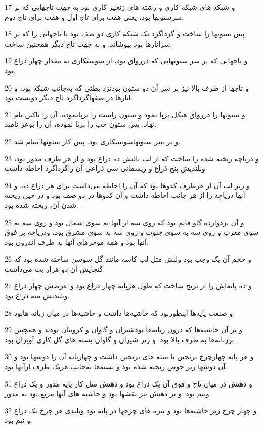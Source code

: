 \par 17 و شبکه های شبکه کاری و رشته های زنجیر کاری بود به جهت تاجهایی که بر سرستونها بود، یعنی هفت برای تاج اول و هفت برای تاج دوم.
\par 18 پس ستونها را ساخت و گرداگرد یک شبکه کاری دو صف بود تا تاجهایی را که بر سرانارها بود بپوشاند. و به جهت تاج دیگر همچنین ساخت.
\par 19 و تاجهایی که بر سر ستونهایی که دررواق بود، از سوسنکاری به مقدار چهار ذراع بود.
\par 20 و تاجها از طرف بالا نیز بر سر آن دو ستون بودنزد بطنی که به‌جانب شبکه بود، و انارها در صفهاگرداگرد تاج دیگر دویست بود.
\par 21 و ستونها را دررواق هیکل برپا نمود و ستون راست را برپانموده، آن را یاکین نام نهاد. پس ستون چپ را برپا نموده، آن را بوعز نامید.
\par 22 و بر سر ستونهاسوسنکاری بود. پس کار ستونها تمام شد.
\par 23 و دریاچه ریخته شده را ساخت که از لب تالبش ده ذراع بود و از هر طرف مدور بود، وبلندیش پنج ذراع و ریسمانی سی ذراعی آن راگرداگرد احاطه داشت.
\par 24 و زیر لب آن از هرطرف کدوها بود که آن را احاطه می‌داشت برای هر ذراع ده، و آنها دریاچه را از هر جانب احاطه داشت و آن کدوها در دو صف بود و در حین ریخته شدن آن، ریخته شده بود. 
\par 25 و آن بردوازده گاو قایم بود که روی سه از آنها به سوی شمال بود و روی سه به سوی مغرب و روی سه به سوی جنوب و روی سه به سوی مشرق بود، ودریاچه بر فوق آنها بود و همه موخرهای آنها به طرف اندرون بود.
\par 26 و حجم آن یک وجب بود ولبش مثل لب کاسه مانند گل سوسن ساخته شده بود که گنجایش آن دو هزار بت می‌داشت.
\par 27 و ده پایه‌اش را از برنج ساخت که طول هرپایه چهار ذراع بود و عرضش چهار ذراع وبلندیش سه ذراع بود.
\par 28 و صنعت پایه‌ها اینطوربود که حاشیه‌ها داشت و حاشیه‌ها در میان زبانه هابود.
\par 29 و بر آن حاشیه‌ها که درون زبانه‌ها بودشیران و گاوان و کروبیان بودند و همچنین برزبانه‌ها به طرف بالا بود. و زیر شیران و گاوان بسته های گل کاری آویزان بود.
\par 30 و هر پایه چهارچرخ برنجین با میله های برنجین داشت و چهارپایه آن را دوشها بود و آن دوشها زیر حوض ریخته شده بود و بسته‌ها به‌جانب هریک طرف ازآنها بود.
\par 31 و دهنش در میان تاج و فوق آن یک ذراع بود و دهنش مثل کار پایه مدور و یک ذراع ونیم بود. و بر دهنش نیز نقشها بود و حاشیه های آنها مربع بود نه مدور.
\par 32 و چهار چرخ زیر حاشیه‌ها بود و تیره های چرخها در پایه بود وبلندی هر چرخ یک ذراع و نیم بود.
